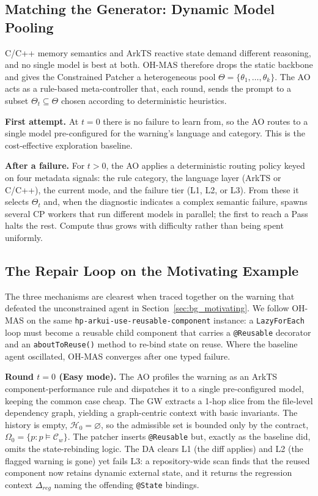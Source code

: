 \documentclass[10pt,conference]{IEEEtran}
\begin{document}
\subsection{Matching the Generator: Dynamic Model Pooling}
\label{sec:app_routing}

C/C++ memory semantics and ArkTS reactive state demand different reasoning, and no single model is best at both. OH-MAS therefore drops the static backbone and gives the Constrained Patcher a heterogeneous pool $\Theta = \{\theta_1, \dots, \theta_k\}$. The AO acts as a rule-based meta-controller that, each round, sends the prompt to a subset $\Theta_t \subseteq \Theta$ chosen according to deterministic heuristics.

\textbf{First attempt.} At $t{=}0$ there is no failure to learn from, so the AO routes to a single model pre-configured for the warning's language and category. This is the cost-effective exploration baseline.

\textbf{After a failure.} For $t>0$, the AO applies a deterministic routing policy keyed on four metadata signals: the rule category, the language layer (ArkTS or C/C++), the current mode, and the failure tier (L1, L2, or L3). From these it selects $\Theta_t$ and, when the diagnostic indicates a complex semantic failure, spawns several CP workers that run different models in parallel; the first to reach a Pass halts the rest. Compute thus grows with difficulty rather than being spent uniformly.

\subsection{The Repair Loop on the Motivating Example}
\label{sec:app_walkthrough}

The three mechanisms are clearest when traced together on the warning that defeated the unconstrained agent in Section~\ref{sec:bg_motivating}. We follow OH-MAS on the same \texttt{hp-arkui-use-reusable-component} instance: a \texttt{LazyForEach} loop must become a reusable child component that carries a \texttt{@Reusable} decorator and an \texttt{aboutToReuse()} method to re-bind state on reuse. Where the baseline agent oscillated, OH-MAS converges after one typed failure.

\textbf{Round $t{=}0$ (Easy mode).} The AO profiles the warning as an ArkTS component-performance rule and dispatches it to a single pre-configured model, keeping the common case cheap. The GW extracts a 1-hop slice from the file-level dependency graph, yielding a graph-centric context with basic invariants. The history is empty, $\mathcal{H}_0=\varnothing$, so the admissible set is bounded only by the contract, $\Omega_0=\{p: p\models\mathcal{C}_w\}$. The patcher inserts \texttt{@Reusable} but, exactly as the baseline did, omits the state-rebinding logic. The DA clears L1 (the diff applies) and L2 (the flagged warning is gone) yet fails L3: a repository-wide scan finds that the reused component now retains dynamic external state, and it returns the regression context $\Delta_{reg}$ naming the offending \texttt{@State} bindings.
\end{document}
